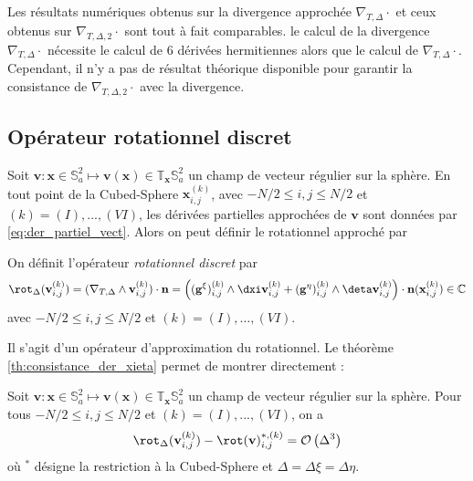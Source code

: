 Les résultats numériques obtenus sur la divergence approchée $\nabla_{T,\Delta} \cdot$ et ceux obtenus sur $\nabla_{T,\Delta,2} \cdot$ sont tout à fait comparables. le calcul de la divergence $\nabla_{T,\Delta} \cdot$ nécessite le calcul de 6 dérivées hermitiennes alors que le calcul de $\nabla_{T,\Delta} \cdot$. Cependant, il n'y a pas de résultat théorique disponible pour garantir la consistance de $\nabla_{T,\Delta,2} \cdot$ avec la divergence.























\subsection{Opérateur rotationnel discret}

Soit $\mathbf{v} : \mathbf{x} \in \mathbb{S}_a^2 \mapsto \mathbf{v}(\mathbf{x}) \in \mathbb{T}_{\mathbf{x}} \mathbb{S}_a^2$ un champ de vecteur régulier sur la sphère. En tout point de la Cubed-Sphere $\mathbf{x}_{i,j}^{(k)}$, avec $-N/2 \leq i,j \leq N/2$ et $(k) = (I), ..., (VI)$, les dérivées partielles approchées de $\mathbf{v}$ sont données par \eqref{eq:der_partiel_vect}. Alors on peut définir le rotationnel approché par 

\begin{definition}
On définit l'opérateur \textit{rotationnel discret} par 
\begin{equation}
\rot_{\Delta} (\mathbf{v}_{i,j}^{(k)}) = (\nabla_{T,\Delta} \wedge \mathbf{v}_{i,j}^{(k)}) \cdot \mathbf{n} = \left( ( \mathbf{g}^{\xi} )_{i,j}^{(k)} \wedge \dxi \mathbf{v}_{i,j}^{(k)}   + ( \mathbf{g}^{\eta} )_{i,j}^{(k)} \wedge \deta \mathbf{v}_{i,j}^{(k)} \right) \cdot \mathbf{n}(\mathbf{x}_{i,j}^{(k)}) \in \mathbb{C}
\end{equation}
avec $-N/2 \leq i,j \leq N/2$ et $(k) = (I), \ldots , (VI)$.
\label{def:rotationnel_disc}
\end{definition}

Il s'agit d'un opérateur d'approximation du rotationnel. Le théorème \ref{th:consistance_der_xieta} permet de montrer directement :

\begin{proposition}
Soit $\mathbf{v} : \mathbf{x} \in \mathbb{S}_a^2 \mapsto \mathbf{v}(\mathbf{x}) \in \mathbb{T}_{\mathbf{x}} \mathbb{S}_a^2$ un champ de vecteur régulier sur la sphère. Pour tous $-N/2 \leq i,j \leq N/2$ et $(k) = (I), ..., (VI)$, on a
\begin{equation}
\rot_{\Delta}(\mathbf{v}_{i,j}^{(k)}) - \rot(\mathbf{v})^{*,(k)}_{i,j} = \mathcal{O} \left( \Delta^3  \right) 
\end{equation}
où $^*$ désigne la restriction à la Cubed-Sphere et $\Delta = \Delta \xi = \Delta \eta$.
\end{proposition}

